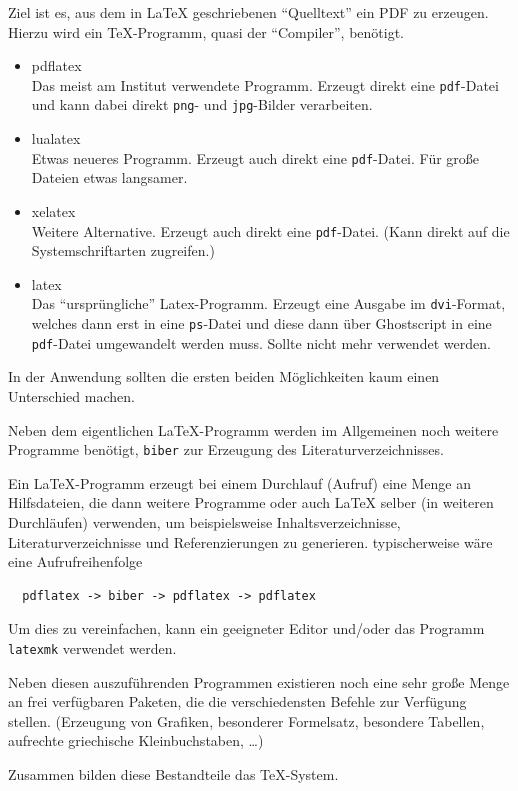 Ziel ist es, aus dem in \LaTeX{} geschriebenen "`Quelltext"' ein PDF zu erzeugen. Hierzu wird ein \TeX-Programm, quasi der "`Compiler"', benötigt.
\begin{itemize}
  \item pdflatex\\
    Das meist am Institut verwendete Programm.
    Erzeugt direkt eine \verb|pdf|-Datei und kann dabei direkt \verb|png|- und \verb|jpg|-Bilder verarbeiten.
  \item lualatex\\
    Etwas neueres Programm.
    Erzeugt auch direkt eine \verb|pdf|-Datei.
    Für große Dateien etwas langsamer.
  \item xelatex\\
    Weitere Alternative.
    Erzeugt auch direkt eine \verb|pdf|-Datei.
    (Kann direkt auf die Systemschriftarten zugreifen.)
  \item latex\\
    Das "`ursprüngliche"' Latex-Programm.
    Erzeugt eine Ausgabe im \verb|dvi|-Format, welches dann erst in eine \verb|ps|-Datei und diese dann über Ghostscript in eine \verb|pdf|-Datei umgewandelt werden muss.
    Sollte nicht mehr verwendet werden.
\end{itemize}
In der Anwendung sollten die ersten beiden Möglichkeiten kaum einen Unterschied machen.

Neben dem eigentlichen \LaTeX-Programm werden im Allgemeinen noch weitere Programme benötigt, \zB \verb|biber| zur Erzeugung des Literaturverzeichnisses.

Ein \LaTeX-Programm erzeugt bei einem Durchlauf (Aufruf) eine Menge an Hilfsdateien, die dann weitere Programme oder auch \LaTeX{} selber (in weiteren Durchläufen) verwenden, um beispielsweise Inhaltsverzeichnisse, Literaturverzeichnisse und Referenzierungen zu generieren.
\Dah typischerweise wäre eine Aufrufreihenfolge
\begin{verbatim}
  pdflatex -> biber -> pdflatex -> pdflatex
\end{verbatim}
Um dies zu vereinfachen, kann ein geeigneter Editor und/oder das Programm \verb|latexmk| verwendet werden.

Neben diesen auszuführenden Programmen existieren noch eine sehr große Menge an frei verfügbaren Paketen, die die verschiedensten Befehle zur Verfügung stellen.
(Erzeugung von Grafiken, besonderer Formelsatz, besondere Tabellen, aufrechte griechische Kleinbuchstaben, \ldots)

Zusammen bilden diese Bestandteile das \TeX-System.



